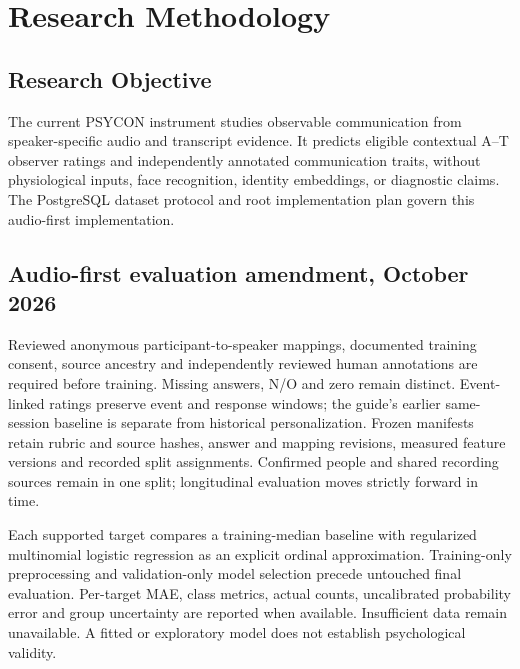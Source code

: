\section{Research Methodology}
\label{sec:research-methodology}

\subsection{Research Objective}
\label{sec:research-objective}

The current PSYCON instrument studies observable communication from speaker-specific audio and transcript evidence. It predicts eligible contextual A--T observer ratings and independently annotated communication traits, without physiological inputs, face recognition, identity embeddings, or diagnostic claims. The PostgreSQL dataset protocol and root implementation plan govern this audio-first implementation.

\subsection{Audio-first evaluation amendment, October 2026}

Reviewed anonymous participant-to-speaker mappings, documented training consent, source ancestry and independently reviewed human annotations are required before training. Missing answers, N/O and zero remain distinct. Event-linked ratings preserve event and response windows; the guide's earlier same-session baseline is separate from historical personalization. Frozen manifests retain rubric and source hashes, answer and mapping revisions, measured feature versions and recorded split assignments. Confirmed people and shared recording sources remain in one split; longitudinal evaluation moves strictly forward in time.

Each supported target compares a training-median baseline with regularized multinomial logistic regression as an explicit ordinal approximation. Training-only preprocessing and validation-only model selection precede untouched final evaluation. Per-target MAE, class metrics, actual counts, uncalibrated probability error and group uncertainty are reported when available. Insufficient data remain unavailable. A fitted or exploratory model does not establish psychological validity.


